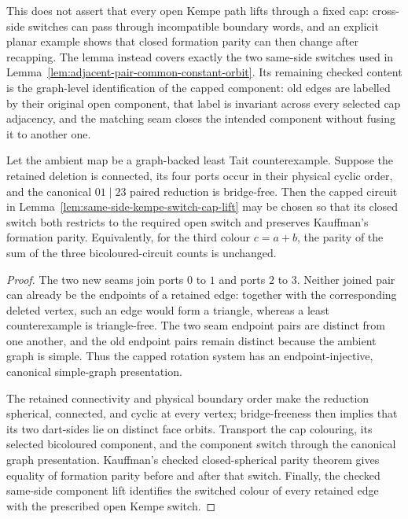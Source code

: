 This does not assert that every open Kempe path lifts through a fixed cap:
cross-side switches can pass through incompatible boundary words, and an
explicit planar example shows that closed formation parity can then change
after recapping.  The lemma instead covers exactly the two same-side switches
used in Lemma~\ref{lem:adjacent-pair-common-constant-orbit}.  Its remaining
checked content is the graph-level identification of the capped component:
old edges are labelled by their original open component, that label is
invariant across every selected cap adjacency, and the matching seam closes
the intended component without fusing it to another one.

\begin{corollary}
\label{cor:same-side-cap-formation-parity}
Let the ambient map be a graph-backed least Tait counterexample.  Suppose the
retained deletion is connected, its four ports occur in their physical cyclic
order, and the canonical \(01\mid23\) paired reduction is bridge-free.  Then
the capped circuit in
Lemma~\ref{lem:same-side-kempe-switch-cap-lift} may be chosen so that its
closed switch both restricts to the required open switch and preserves
Kauffman's formation parity.  Equivalently, for the third colour
\(c=a+b\), the parity of the sum of the three bicoloured-circuit counts is
unchanged.
\end{corollary}

\begin{proof}
The two new seams join ports \(0\) to \(1\) and ports \(2\) to \(3\).
Neither joined pair can already be the endpoints of a retained edge: together
with the corresponding deleted vertex, such an edge would form a triangle,
whereas a least counterexample is triangle-free.  The two seam endpoint pairs
are distinct from one another, and the old endpoint pairs remain distinct
because the ambient graph is simple.  Thus the capped rotation system has an
endpoint-injective, canonical simple-graph presentation.

The retained connectivity and physical boundary order make the reduction
spherical, connected, and cyclic at every vertex; bridge-freeness then implies
that its two dart-sides lie on distinct face orbits.  Transport the cap
colouring, its selected bicoloured component, and the component switch through
the canonical graph presentation.  Kauffman's checked closed-spherical parity
theorem gives equality of formation parity before and after that switch.
Finally, the checked same-side component lift identifies the switched colour
of every retained edge with the prescribed open Kempe switch.
\end{proof}

